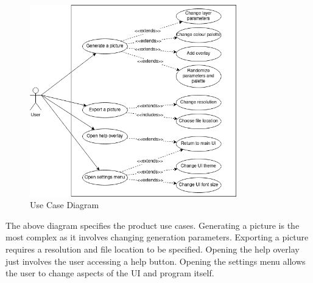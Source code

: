 \documentclass[12pt, titlepage]{article}
\begin{document}
\begin{figure}[H]
    \centering
    \includegraphics[width=0.8\textwidth]{use cases.png}
    \caption{Use Case Diagram}
    \label{fig:context}
\end{figure}

The above diagram specifies the product use cases. Generating a picture is the most complex as it involves changing generation parameters. Exporting a picture requires a resolution and file location to be specified. Opening the help overlay just involves the user accessing a help button. Opening the settings menu allows the user to change aspects of the UI and program itself.
\end{document}

